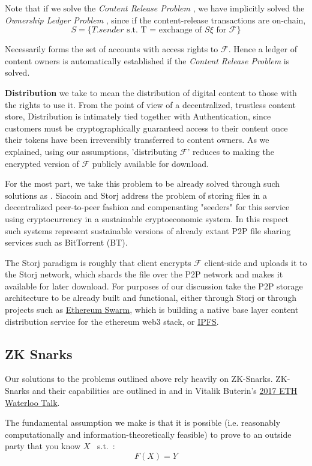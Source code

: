 \documentclass[12pt,oneside]{amsart}
\def\file{\mathcal{F}}
\def\ether{\xi}
\def\crp{\textit{Content Release Problem} }
\def\olp{\textit{Ownership Ledger Problem} }
\newcommand{\st}{\mbox{ s.t. }}
\begin{document}
\begin{multicols}{2}
Note that if we solve the \crp, we have implicitly solved the \olp, since if the content-release transactions are on-chain,
\[
S = \{ T.sender \st \text{T = exchange of $S\ether$ for $\file$} \}
\]

Necessarily forms the set of accounts with access rights to $\file$.
Hence a ledger of content owners is automatically established if the \crp is solved.

\textbf{Distribution} we take to mean the distribution of digital content to those with the rights to use it.
From the point of view of a decentralized, trustless content store, Distribution is intimately tied together with Authentication, since customers must be cryptographically guaranteed access to their content once their tokens have been irreversibly transferred to content owners.
As we explained, using our assumptions, 'distributing $\file$' reduces to making the encrypted version of $\file$ publicly available for download.

For the most part, we take this problem to be already solved through such solutions as \cite{wilkinson2016storj}.
Siacoin and Storj address the problem of storing files in a decentralized peer-to-peer fashion and compensating "seeders" for this service using cryptocurrency in a sustainable cryptoeconomic system.
In this respect such systems represent sustainable versions of already extant P2P file sharing services such as BitTorrent (BT).

The Storj paradigm is roughly that client encrypts $\file$ client-side and uploads it to the Storj network, which shards the file over the P2P network and makes it available for later download.
For purposes of our discussion take the P2P storage architecture to be already built and functional, either through Storj or through projects such as \href{https://github.com/ethersphere/swarm}{Ethereum Swarm}, which is building a native base layer content distribution service for the ethereum web3 stack, or \href{https://ipfs.io/}{IPFS}.

\subsection{ZK Snarks}

Our solutions to the problems outlined above rely heavily on ZK-Snarks.
ZK-Snarks and their capabilities are outlined in \cite{buterin2016quadraticArithmetic} and in Vitalik Buterin's \href{https://youtu.be/pcWEdyBBGrk?t=1h28m28s}{2017 ETH Waterloo Talk}.

The fundamental assumption we make is that it is possible (i.e. reasonably computationally and information-theoretically feasible) to prove to an outside party that you know $X$ \st:
\[
F(X) = Y
\]


\end{multicols}
\end{document}

